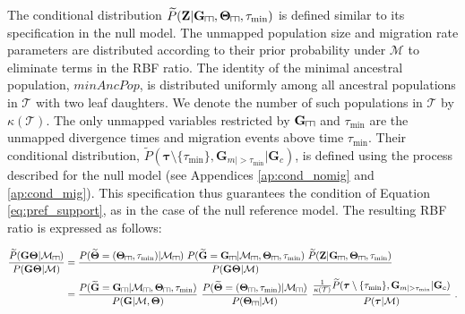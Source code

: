 \documentclass[11pt]{article}
\newcommand{\vect}[1]{\boldsymbol{\mathbf{#1}}}
\newcommand{\M}{\mathcal{M}}
\newcommand{\Tr}{\mathcal{T}}
\newcommand{\G}{\vect{G}}
\newcommand{\T}{\vect{\Theta}}
\newcommand{\GT}{\G\T}
\newcommand{\Pref}{\widetilde{P}}
\newcommand{\Gref}{\widetilde{\G}}
\newcommand{\Tref}{\widetilde{\T}}
\newcommand{\1}{\mathbbm{1}}
\newcommand{\Z}{\vect{Z}}
\newcommand{\Gc}{\G_c}
\def\comb{\rotatebox[origin=c]{90}{$\exists$}}
\newcommand{\Mcomb}{\M_{\comb}}
\newcommand{\Gcomb}{\G_{\comb}}
\newcommand{\Tcomb}{\T_{\comb}}
\newcommand{\tmin}{\tau_{\text{min}}}
\newcommand{\taus}{\vect\tau}
\def\comb{\rotatebox[origin=c]{90}{$\exists$}}
\begin{document}
The conditional distribution $\Pref(\Z|\Gcomb,\Tcomb,\tmin)$ is defined similar to its specification in the null model.
%
The unmapped population size and migration rate parameters are distributed according to their prior probability under $\M$ to eliminate terms in the RBF ratio.
%
The identity of the minimal ancestral population, $minAncPop$, is distributed uniformly among all ancestral populations in $\Tr$ with two leaf daughters.
%
We denote the number of such populations in $\Tr$ by $\kappa(\Tr)$.
%
The only unmapped variables restricted by $\Gcomb$ and $\tmin$ are the unmapped divergence times and migration events above time $\tmin$. Their conditional distribution,
$\Pref(\taus\setminus\{\tmin\},\G_{m|>\tmin}|\Gc)$, is defined using the process described for the null model (see Appendices \ref{ap:cond_nomig} and \ref{ap:cond_mig}).
%
This specification thus guarantees the condition of Equation \ref{eq:pref_support}, as in the case of the null reference model.
%
The resulting RBF ratio is expressed as follows:
%
%
\begin{small}
\begin{align}
\frac{\Pref(\GT|\Mcomb) }{P(\GT|\M)}
&= \frac{ P(\Tref=(\Tcomb,\tmin)|\Mcomb) ~ P(\Gref=\Gcomb|\Mcomb,\Tcomb,\tmin) ~ \Pref(\Z|\Gcomb,\Tcomb,\tmin) } {P(\GT|\M)} \notag \\
&= \frac{ P(\Gref=\Gcomb|\Mcomb,\Tcomb,\tmin) }{ P(\G|\M,\T)}~ 
   \frac{ P(\Tref=(\Tcomb,\tmin)|\Mcomb) }{ P(\Tcomb|\M) }~
   \frac{ \frac{1}{\kappa(\Tr)}\Pref(\taus\setminus\{\tmin\},\G_{m|>\tmin}|\Gc)}{P(\taus|\M)} ~. \label{eq:rbf_comb}
\end{align}
\end{small}
\end{document}
